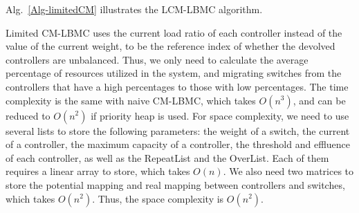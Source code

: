 Alg.~\ref{Alg-limitedCM} illustrates the LCM-LBMC algorithm.

Limited CM-LBMC uses the current load ratio of each controller instead of the value of the current weight, to be the reference index of whether the devolved controllers are unbalanced. Thus, we only need to calculate the average percentage of resources utilized in the system, and migrating switches from the controllers that have a high percentages to those with low percentages. The time complexity is the same with naive CM-LBMC, which takes $O(n^3)$, and can be reduced to $O(n^2)$ if priority heap is used. For space complexity, we need to use several lists to store the following parameters: the weight of a switch, the current of a controller, the maximum capacity of a controller, the threshold and effluence of each controller, as well as the RepeatList and the OverList. Each of them requires a linear array to store, which takes $O(n)$. We also need two matrices to store the potential mapping and real mapping between controllers and switches, which takes $O(n^2)$. Thus, the space complexity is $O(n^2)$.


